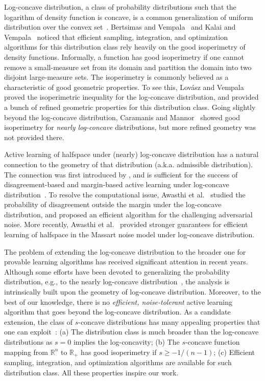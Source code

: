 \documentclass[11pt]{article}
\newcommand{\R}{\mathbb{R}}
\begin{document}
\medskip
{} Log-concave distribution, a class of probability distributions such that the logarithm of density function is concave, is a common generalization of uniform distribution over the convex set~\cite{lovasz2007geometry}. Bertsimas and Vempala~\cite{bertsimas2004solving} and Kalai and Vempala~\cite{kalai2006simulated} noticed that efficient sampling, integration, and optimization algorithms for this distribution class rely heavily on the good isoperimetry of density functions. Informally, a function has good isoperimetry if one cannot remove a small-measure set from its domain and partition the domain into two disjoint large-measure sets. The isoperimetry is commonly believed as a characteristic of good geometric properties. To see this, Lov{\'a}sz and Vempala~\cite{lovasz2007geometry} proved the isoperimetric inequality for the log-concave distribution, and provided a bunch of refined geometric properties for this distribution class. Going slightly beyond the log-concave distribution, Caramanis and Mannor~\cite{caramanis2007inequality} showed good isoperimetry for \emph{nearly log-concave} distributions, but more refined geometry was not provided there.

Active learning of halfspace under (nearly) log-concave distribution has a natural connection to the geometry of that distribution (a.k.a. admissible distribution). The connection was first introduced by \cite{balcan2013active}, and is sufficient for the success of disagreement-based and margin-based active learning under log-concave distribution~\cite{balcan2013active}. To resolve the computational issue, Awasthi et al.~\cite{awasthi2014power} studied the probability of disagreement outside the margin under the log-concave distribution, and proposed an efficient algorithm for the challenging adversarial noise. More recently, Awasthi et al.~\cite{awasthi2016learning} provided stronger guarantees for efficient learning of halfspace in the Massart noise model under log-concave distribution.

\medskip
{} The problem of extending the log-concave distribution to the broader one for provable learning algorithms has received significant attention in recent years. Although some efforts have been devoted to generalizing the probability distribution, e.g., to the nearly log-concave distribution~\cite{balcan2013active}, the analysis is intrinsically built upon the geometry of log-concave distribution. Moreover, to the best of our knowledge, there is no \emph{efficient, noise-tolerant} active learning algorithm that goes beyond the log-concave distribution. As a candidate extension, the class of $s$-concave distributions has many appealing properties that one can exploit~\cite{chandrasekaran2009sampling,han2016approximation}: (a) The distribution class is much broader than the log-concave distributions as $s=0$ implies the log-concavity; (b) The $s$-concave function mapping from $\R^n$ to $\R_+$ has good isoperimetry if $s\ge -1/(n-1)$; (c) Efficient sampling, integration, and optimization algorithms are available for such distribution class. All these properties inspire our work.
\end{document}
